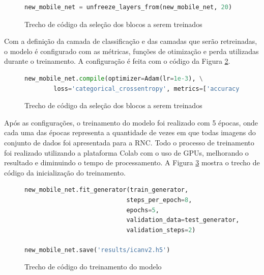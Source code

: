 \begin{figure}[H]
    \centering
    \caption{Trecho de código da seleção dos blocos a serem treinados}
    \begin{lstlisting}[language=Python]
new_mobile_net = unfreeze_layers_from(new_mobile_net, 20)
    \end{lstlisting}
    \label{figure:descongelamento_modelo}
\end{figure}

\par Com a definição da camada de classificação e das camadas que serão retreinadas, o modelo é configurado com as métricas, funções de otimização e perda utilizadas durante o treinamento. A configuração é feita com o código da Figura \ref{figure:configuracao_do_modelo_para_treino}.

\begin{figure}[H]
    \centering
    \caption{Trecho de código da seleção dos blocos a serem treinados}
    \begin{lstlisting}[language=Python]
new_mobile_net.compile(optimizer=Adam(lr=1e-3), \
        loss='categorical_crossentropy', metrics=['accuracy'])
    \end{lstlisting}
    \label{figure:configuracao_do_modelo_para_treino}
\end{figure}

\par Após as configurações, o treinamento do modelo foi realizado com 5 épocas, onde cada uma das épocas representa a quantidade de vezes em que todas imagens do conjunto de dados foi apresentada para a RNC. Todo o processo de treinamento foi realizado utilizando a plataforma Colab com o uso de GPUs, melhorando o resultado e diminuindo o tempo de processamento. A Figura \ref{figure:treinamento_do_modelo} mostra o trecho de código da inicialização do treinamento.

\begin{figure}[H]
    \centering
    \caption{Trecho de código do treinamento do modelo}
    \begin{lstlisting}[language=Python]
new_mobile_net.fit_generator(train_generator,
                            steps_per_epoch=8,
                            epochs=5,
                            validation_data=test_generator,
                            validation_steps=2)

new_mobile_net.save('results/icanv2.h5')
    \end{lstlisting}
    \label{figure:treinamento_do_modelo}
\end{figure}

